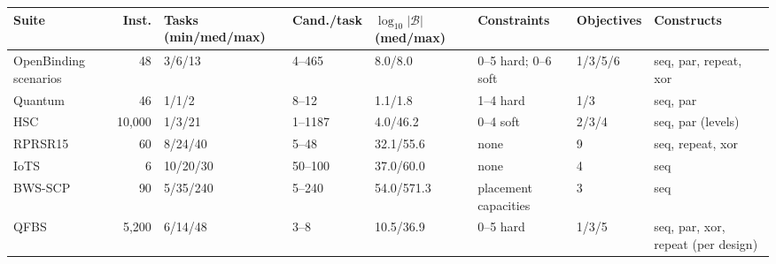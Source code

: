 \begin{tabular}{lrllllll}
\toprule
Suite & Inst. & Tasks (min/med/max) & Cand./task & $\log_{10}|\mathcal{B}|$ (med/max) & Constraints & Objectives & Constructs \\
\midrule
OpenBinding scenarios & 48 & 3/6/13 & 4–465 & 8.0/8.0 & 0–5 hard; 0–6 soft & 1/3/5/6 & seq, par, repeat, xor \\
Quantum & 46 & 1/1/2 & 8–12 & 1.1/1.8 & 1–4 hard & 1/3 & seq, par \\
HSC & 10,000 & 1/3/21 & 1–1187 & 4.0/46.2 & 0–4 soft & 2/3/4 & seq, par (levels) \\
RPRSR15 & 60 & 8/24/40 & 5–48 & 32.1/55.6 & none & 9 & seq, repeat, xor \\
IoTS & 6 & 10/20/30 & 50–100 & 37.0/60.0 & none & 4 & seq \\
BWS-SCP & 90 & 5/35/240 & 5–240 & 54.0/571.3 & placement capacities & 3 & seq \\
QFBS & 5,200 & 6/14/48 & 3–8 & 10.5/36.9 & 0–5 hard & 1/3/5 & seq, par, xor, repeat (per design) \\
\bottomrule
\end{tabular}
